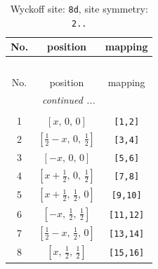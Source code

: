 \documentclass[fleqn,8pt]{jsarticle}
\begin{document}
\begin{longtable}{ccc}
\caption{Wyckoff site: {\tt 8d}, site symmetry: {\tt 2..}}
 \\
 \hline \hline
No. & position & mapping \\ \hline \endfirsthead

\multicolumn{2}{l}{\tablename\ \thetable{}} \\
 \hline \hline
No. & position & mapping \\ \hline \endhead

 \hline \hline
\multicolumn{2}{r}{\footnotesize\it continued ...} \\ \endfoot

 \hline \hline
\multicolumn{2}{r}{} \\ \endlastfoot

1 & $\left[ x,\, 0,\, 0 \right]$ & {\tt [1,2]} \\ \hline
2 & $\left[ \frac{1}{2} - x,\, 0,\, \frac{1}{2} \right]$ & {\tt [3,4]} \\ \hline
3 & $\left[ - x,\, 0,\, 0 \right]$ & {\tt [5,6]} \\ \hline
4 & $\left[ x + \frac{1}{2},\, 0,\, \frac{1}{2} \right]$ & {\tt [7,8]} \\ \hline
5 & $\left[ x + \frac{1}{2},\, \frac{1}{2},\, 0 \right]$ & {\tt [9,10]} \\ \hline
6 & $\left[ - x,\, \frac{1}{2},\, \frac{1}{2} \right]$ & {\tt [11,12]} \\ \hline
7 & $\left[ \frac{1}{2} - x,\, \frac{1}{2},\, 0 \right]$ & {\tt [13,14]} \\ \hline
8 & $\left[ x,\, \frac{1}{2},\, \frac{1}{2} \right]$ & {\tt [15,16]} \\
\end{longtable}
\renewcommand{\arraystretch}{1.2}
\end{document}
